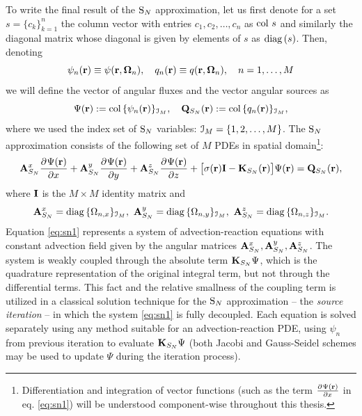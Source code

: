 To write  the final result of the $\text{S}_{N}$ approximation, let us first denote for a set $s = \{c_k\}_{k=1}^n$ the column
vector with entries $c_1,c_2,\ldots,c_n$ as $\operatorname{col\,} s$ and similarly the diagonal matrix whose diagonal is
given by elements of $s$ as $\operatorname{diag\,}(s)$. Then, denoting
\begin{equation}\label{eq:sn_vecs}
\psi_n(\mathbf{r}) \equiv \psi(\mathbf{r},\mathbf{\Omega}_n), \quad q_n(\mathbf{r}) \equiv
q(\mathbf{r},\mathbf{\Omega}_n),\quad n = 1,\ldots, M	
\end{equation}
we will define the vector of angular fluxes and the vector angular sources as
\begin{equation}\label{eq:sn_vars}
\Psi(\mathbf{r}) := \operatorname{col\,}\{\psi_n(\mathbf{r})\}_{\mathcal{I}_{M}},\quad
\mathbf{Q}_{S_N}(\mathbf{r}) := \operatorname{col\,}\{q_n(\mathbf{r})\}_{\mathcal{I}_{M}},
\end{equation}
where we used the index set of $\text{S}_{N}$ variables: $\mathcal{I}_{M} = \{1,2,\ldots,M\}$.
The $\text{S}_{N}$ approximation consists of the following set of $M$ PDEs in spatial domain\footnote{Differentiation and
integration of vector functions (such as the term $\frac{\partial^{}\Psi(\mathbf{r})}{\partial x^{}}$ in eq. \eqref{eq:sn1}) will be understood
component-wise throughout this thesis.}:
\begin{equation}\label{eq:sn1} 
\mathbf{A}_{S_N}^x\frac{\partial^{}\Psi(\mathbf{r})}{\partial x^{}} + \mathbf{A}_{S_N}^y\frac{\partial^{}\Psi(\mathbf{r})}{\partial y^{}} +
\mathbf{A}_{S_N}^z\frac{\partial^{}\Psi(\mathbf{r})}{\partial z^{}} + \bigl[\sigma(\mathbf{r})\mathbf{I} - \mathbf{K}_{S_N}(\mathbf{r})\bigr]\Psi(\mathbf{r}) = \mathbf{Q}_{S_N}(\mathbf{r}),
\end{equation}
where $\mathbf{I}$ is the $M\times M$ identity matrix and
$$
	\mathbf{A}_{S_N}^x = \operatorname{diag\,}\{\Omega_{n,x}\}_{\mathcal{I}_{M}},\ \mathbf{A}_{S_N}^y = \operatorname{diag\,}\{\Omega_{n,y}\}_{\mathcal{I}_{M}},\
	\mathbf{A}_{S_N}^z = \operatorname{diag\,}\{\Omega_{n,z}\}_{\mathcal{I}_{M}}.
$$
Equation
\eqref{eq:sn1} represents a system of advection-reaction equations with constant advection field given by the angular 
matrices $\mathbf{A}_{S_N}^x, \mathbf{A}_{S_N}^y, \mathbf{A}_{S_N}^z$. The system is weakly coupled through the absolute term
$\mathbf{K}_{S_N}\Psi$, which is the quadrature representation of the original integral term, but not through the
differential terms. This fact and the relative smallness of the coupling term is utilized in a classical solution
technique for the $\text{S}_{N}$ approximation -- the \textit{source iteration} -- in which the system \eqref{eq:sn1} is fully
decoupled. Each equation is solved separately using any method suitable for an advection-reaction PDE, using $\psi_n$
from previous iteration to evaluate $\mathbf{K}_{S_N}\Psi$ (both Jacobi and Gauss-Seidel schemes may be used to update
$\Psi$ during the iteration process).


